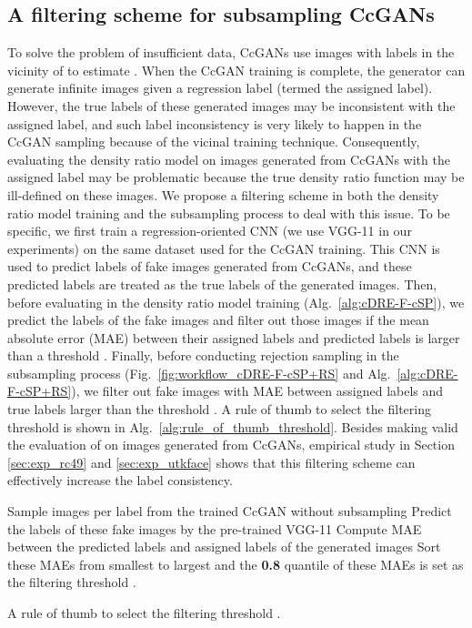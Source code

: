 \documentclass[10pt, twocolumn]{article}
\theoremstyle{definition}
\begin{document}
\subsection{A filtering scheme for subsampling CcGANs}\label{sec:filtering_CcGAN}

To solve the problem of insufficient data, CcGANs use images with labels in the vicinity of  to estimate . When the CcGAN training is complete, the generator can generate infinite images given a regression label  (termed the assigned label). However, the true labels of these generated images may be inconsistent with the assigned label, and such label inconsistency is very likely to happen in the CcGAN sampling because of the vicinal training technique. Consequently, evaluating the density ratio model  on images generated from CcGANs with the assigned label  may be problematic because the true density ratio function  may be ill-defined on these images. We propose a filtering scheme in both the density ratio model training and the subsampling process to deal with this issue. To be specific, we first train a regression-oriented CNN (we use VGG-11 \cite{simonyan2014very} in our experiments) on the same dataset used for the CcGAN training. This CNN is used to predict labels of fake images generated from CcGANs, and these predicted labels are treated as the true labels of the generated images. Then, before evaluating  in the density ratio model training (Alg.\ \ref{alg:cDRE-F-cSP}), we predict the labels of the  fake images and filter out those images if the mean absolute error (MAE) between their assigned labels and predicted labels is larger than a threshold . Finally, before conducting rejection sampling in the subsampling process (Fig.\ \ref{fig:workflow_cDRE-F-cSP+RS} and Alg.\ \ref{alg:cDRE-F-cSP+RS}), we filter out fake images with MAE between assigned labels and true labels larger than the threshold . A rule of thumb to select the filtering threshold  is shown in Alg.\ \ref{alg:rule_of_thumb_threshold}. Besides making valid the evaluation of  on images generated from CcGANs, empirical study in Section \ref{sec:exp_rc49} and \ref{sec:exp_utkface} shows that this filtering scheme can effectively increase the label consistency. 

\begin{algorithm}[!htbp]
	\footnotesize
	\SetAlgoLined
	Sample  images per label from the trained CcGAN without subsampling\;
	Predict the labels of these fake images by the pre-trained VGG-11\;
	Compute MAE between the predicted labels and assigned labels of the generated images\;
	Sort these MAEs from smallest to largest and the \textbf{0.8} quantile of these MAEs is set as the filtering threshold .
	\caption{A rule of thumb to select the filtering threshold .}
	\label{alg:rule_of_thumb_threshold}
\end{algorithm}
\end{document}

